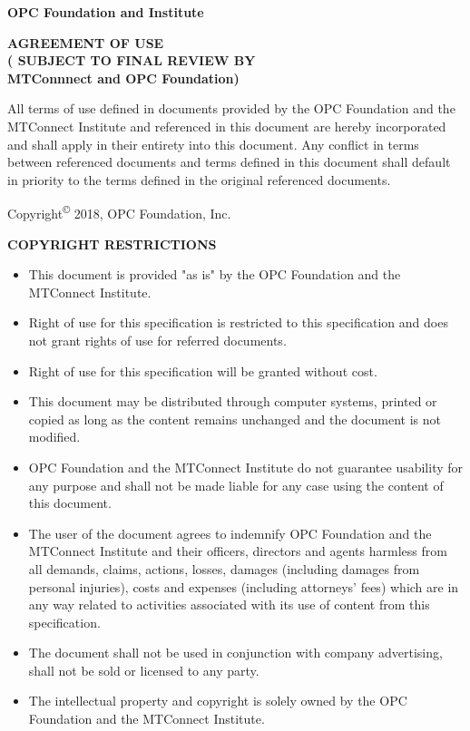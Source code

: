 \textbf{\Large {OPC Foundation and \mtconnect Institute}}

\begin{center}
    \textbf{AGREEMENT OF USE \\ 
    ({\color{red} SUBJECT TO FINAL REVIEW BY \\ 
    MTConnnect and OPC Foundation})}
\end{center}

All terms of use defined in documents provided by the OPC Foundation and the MTConnect Institute and referenced in this document are hereby incorporated and shall apply in their entirety into this document.   Any conflict in terms between referenced documents and terms defined in this document shall default in priority to the terms defined in the original referenced documents.

Copyright\textsuperscript{\copyright} 2018, OPC Foundation, Inc.

\textbf{COPYRIGHT RESTRICTIONS}

\begin{itemize}
    \item This document is provided "as is" by the OPC Foundation and the MTConnect Institute.
    \item Right of use for this specification is restricted to this specification and does not grant rights of use for referred documents.
    \item Right of use for this specification will be granted without cost.
    \item This document may be distributed through computer systems, printed or copied as long as the content remains unchanged and the document is not modified.
    \item OPC Foundation and the MTConnect Institute do not guarantee usability for any purpose and shall not be made liable for any case using the content of this document.
    \item The user of the document agrees to indemnify OPC Foundation and the MTConnect Institute and their officers, directors and agents harmless from all demands, claims, actions, losses, damages (including damages from personal injuries), costs and expenses (including attorneys' fees) which are in any way related to activities associated with its use of content from this specification.
    \item The document shall not be used in conjunction with company advertising, shall not be sold or licensed to any party.
    
    \item The intellectual property and copyright is solely owned by the OPC Foundation and the MTConnect Institute.
\end{itemize}

